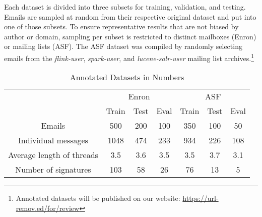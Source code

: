 \documentclass{llncs}
\begin{document}
Each dataset is divided into three subsets for training, validation, and testing.
Emails are sampled at random from their respective original dataset and put into one of those subsets.
To ensure representative results that are not biased by author or domain, sampling per subset is restricted to distinct mailboxes (Enron) or mailing lists (ASF).
The ASF dataset was compiled by randomly selecting emails from the \textit{flink-user}, \textit{spark-user}, and \textit{lucene-solr-user} mailing list archives.\footnote{Annotated datasets will be published on our website: \url{https://url-remov.ed/for/review}}


\begin{table}
	\caption{Annotated Datasets in Numbers}
	\label{tab:dataset}
	\centering
	\begin{tabular*}{\textwidth}{@{\extracolsep{\fill}} ccccccc}
		\toprule
		& \multicolumn{3}{c}{Enron} &  \multicolumn{3}{c}{ASF} \\
		\cmidrule{2-4}
		\cmidrule{5-7}
		                          & Train    & Test   & Eval   & Train   & Test   & Eval  \\
		\midrule
		Emails                    & 500      & 200    & 100    &  350   &  100   &   50   \\
		Individual messages       & 1048     & 474    & 233    &  934   &  226   &   108  \\
		Average length of threads & 3.5      & 3.6    & 3.5    &  3.5   &  3.7   &   3.1  \\
		Number of signatures      & 103      & 58     & 26     &  76    &  13    &   5    \\
		\bottomrule
	\end{tabular*}
\end{table}
\end{document}
